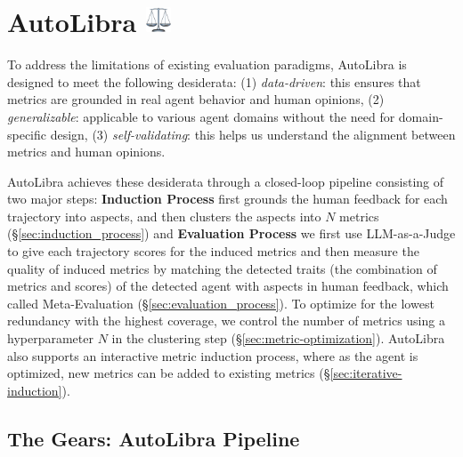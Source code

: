 \section{AutoLibra \protect \includegraphics[height=1em]{figs/scale.png}}




To address the limitations of existing evaluation paradigms, AutoLibra is designed to
meet the following desiderata: (1) \emph{data-driven}: this ensures that metrics are grounded
in real agent behavior and human opinions, (2) \emph{generalizable}: applicable to various agent domains without the need for domain-specific design, (3) \emph{self-validating}: this helps us understand
the alignment between metrics and human opinions.

AutoLibra achieves these desiderata through a closed-loop pipeline
consisting of two major steps: \textbf{Induction Process} first grounds the human feedback
for each trajectory into aspects, and then clusters the aspects into $N$ metrics (\S\ref{sec:induction_process}) and \textbf{Evaluation Process}
we first use LLM-as-a-Judge to give each trajectory scores for the induced metrics and then measure the quality of induced metrics by matching the detected traits (the combination of metrics and scores) of
the detected agent with aspects in human feedback, which called Meta-Evaluation (\S\ref{sec:evaluation_process}).
To optimize for the lowest redundancy with the highest coverage, we control the number of metrics using a hyperparameter $N$ in the clustering step (\S\ref{sec:metric-optimization}). AutoLibra also supports
an interactive metric induction process, where as the agent is optimized, new metrics can be added
to existing metrics (\S\ref{sec:iterative-induction}).
\subsection{The Gears: AutoLibra Pipeline}
